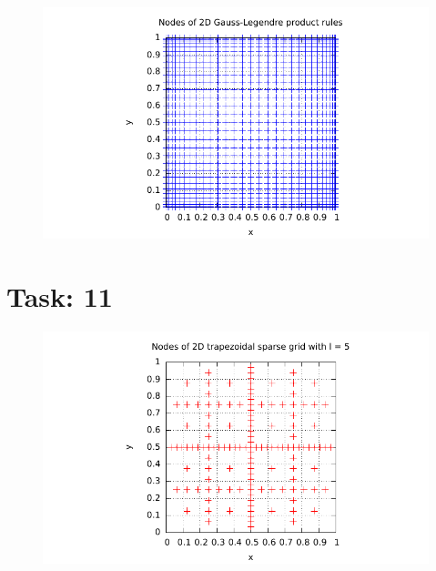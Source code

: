 \documentclass{article}
\begin{document}
\begin{figure}[htbp]
  \centering
     \includegraphics[width=1.0\textwidth]{../Task09/sh3_task9_point_plot_gaussLegendre.pdf}
\end{figure}
\newpage
\section*{Task: 11}

\begin{figure}[htbp]
  \centering
     \includegraphics[width=1.0\textwidth]{../Task11/sh3_task11_point_plot_trapezoidal_l=5.pdf}
\end{figure}
\end{document}
